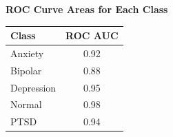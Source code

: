 \begin{center}
    \textbf{ROC Curve Areas for Each Class} \\[0.5em]
    \begin{tabular}{|l|c|}
        \hline
        \textbf{Class}  & \textbf{ROC AUC} \\ \hline
        Anxiety         & 0.92            \\ \hline
        Bipolar         & 0.88            \\ \hline
        Depression      & 0.95            \\ \hline
        Normal          & 0.98            \\ \hline
        PTSD            & 0.94            \\ \hline
    \end{tabular}
\end{center}

